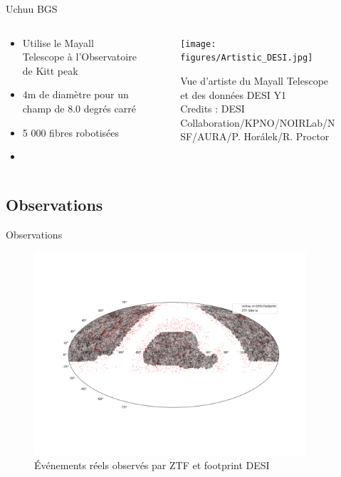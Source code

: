 \documentclass{beamer}
\newcommand{\credits}[1]{\tiny Credits : #1}
\begin{document}
\begin{frame}{Uchuu BGS}
\begin{columns}
\begin{column}{.5\textwidth}
	\begin{itemize}
		\item Utilise le Mayall Telescope à l'Observatoire de Kitt peak 
		\item 4m de diamètre pour un champ de 8.0 degrés carré
		\item 5 000 fibres robotisées
		\item  
	\end{itemize}
\end{column}

\begin{column}{.5\textwidth}
	\begin{figure}
		\centering
		\texttt{[image: figures/Artistic\_DESI.jpg]}
		\caption{Vue d'artiste du Mayall Telescope et des données DESI Y1 \\ \credits{DESI Collaboration/KPNO/NOIRLab/NSF/AURA/P. Horálek/R. Proctor}}
	\end{figure}
\end{column}

\end{columns}
\end{frame}

\subsection{Observations}

\begin{frame}{Observations}
\begin{figure}
	\centering
	\includegraphics[width=0.9\textwidth, trim = {3cm, 5cm, 2cm, 5cm}, clip]{figures/ZTF_on_DESI.png}
	\caption{Événements réels observés par ZTF et footprint DESI}
\end{figure}
\end{frame}
\end{document}
